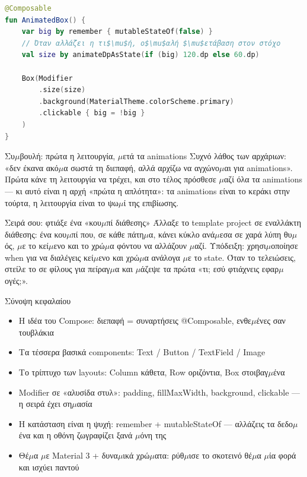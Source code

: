 \begin{lstlisting}[language=Kotlin]
@Composable
fun AnimatedBox() {
    var big by remember { mutableStateOf(false) }
    // Όταν αλλάζει η τι$\mu$ή, ο$\mu$αλή $\mu$ετάβαση στον στόχο
    val size by animateDpAsState(if (big) 120.dp else 60.dp)

    Box(Modifier
        .size(size)
        .background(MaterialTheme.colorScheme.primary)
        .clickable { big = !big }
    )
}
\end{lstlisting}

\begin{tcbinfo}{Συ$\mu$βουλή: πρώτα η λειτουργία, $\mu$ετά τα animations}
Συχνό λάθος των αρχάριων: «δεν έκανα ακό$\mu$α σωστά τη διεπαφή, αλλά αρχίζω να αγχώνο$\mu$αι για animations». Πρώτα κάνε τη λειτουργία να τρέχει, και στο τέλος πρόσθεσε $\mu$αζί όλα τα animations — κι αυτό είναι η αρχή «πρώτα η απλότητα»: τα animations είναι το κεράκι στην τούρτα, η λειτουργία είναι το ψω$\mu$ί της επιβίωσης.

\end{tcbinfo}

\begin{tcbpractice}{Σειρά σου: φτιάξε ένα «κου$\mu$πί διάθεσης»}
Άλλαξε το template project σε εναλλάκτη διάθεσης: ένα κου$\mu$πί που, σε κάθε πάτη$\mu$α, κάνει κύκλο ανά$\mu$εσα σε χαρά λύπη θυ$\mu$ός, $\mu$ε το κεί$\mu$ενο και το χρώ$\mu$α φόντου να αλλάζουν $\mu$αζί. Υπόδειξη: χρησι$\mu$οποίησε when για να διαλέγεις κεί$\mu$ενο και χρώ$\mu$α ανάλογα $\mu$ε το state. Όταν το τελειώσεις, στείλε το σε φίλους για πείραγ$\mu$α και $\mu$άζεψε τα πρώτα «τι; εσύ φτιάχνεις εφαρ$\mu$ογές;».

\end{tcbpractice}

\begin{tcbsummary}{Σύνοψη κεφαλαίου}
\begin{itemize}
  \item Η ιδέα του Compose: διεπαφή = συναρτήσεις @Composable, ενθε$\mu$ένες σαν τουβλάκια
  \item Τα τέσσερα βασικά components: Text / Button / TextField / Image
  \item Το τρίπτυχο των layouts: Column κάθετα, Row οριζόντια, Box στοιβαγ$\mu$ένα
  \item Modifier σε «αλυσίδα στυλ»: padding, fillMaxWidth, background, clickable — η σειρά έχει ση$\mu$ασία
  \item Η κατάσταση είναι η ψυχή: remember + mutableStateOf — αλλάζεις τα δεδο$\mu$ένα και η οθόνη ζωγραφίζει ξανά $\mu$όνη της
  \item Θέ$\mu$α $\mu$ε Material 3 + δυνα$\mu$ικά χρώ$\mu$ατα: ρύθ$\mu$ισε το σκοτεινό θέ$\mu$α $\mu$ία φορά και ισχύει παντού
\end{itemize}

\end{tcbsummary}
